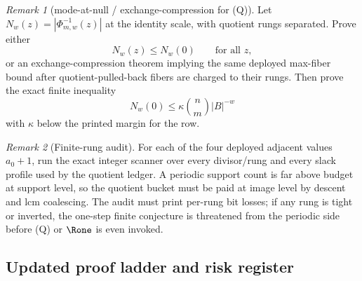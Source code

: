 \documentclass[11pt]{article}
\theoremstyle{definition}
\theoremstyle{remark}
\newtheorem{remark}[remark]{Remark}
\newcommand{\B}{B}
\begin{document}
\begin{remark}[mode-at-null / exchange-compression for \textup{(Q)}]\label{prob:capfr1-mode-null}
Let \(N_w(z)=|\Phi_{m,w}^{-1}(z)|\) at the identity scale, with quotient rungs separated.  Prove either
\[
        N_w(z)
        \le
        N_w(0)
        \qquad\text{for all }z,
\]
or an exchange-compression theorem implying the same deployed max-fiber bound after quotient-pulled-back fibers are charged to their rungs.  Then prove the exact finite inequality
\[
        N_w(0)
        \le
        \kappa\binom n m |\B|^{-w}
\]
with \(\kappa\) below the printed margin for the row.
\end{remark}

\begin{remark}[Finite-rung audit]\label{prob:capfr1-rung-audit}
For each of the four deployed adjacent values \(a_0+1\), run the exact integer scanner over every divisor/rung and every slack profile used by the quotient ledger.  A periodic support count is far above budget at support level, so the quotient bucket must be paid at image level by descent and lcm coalescing.  The audit must print per-rung bit losses; if any rung is tight or inverted, the one-step finite conjecture is threatened from the periodic side before \textup{(Q)} or \(\Rone\) is even invoked.
\end{remark}

\subsection{Updated proof ladder and risk register}\label{subsec:capfr1-risk}
\end{document}
